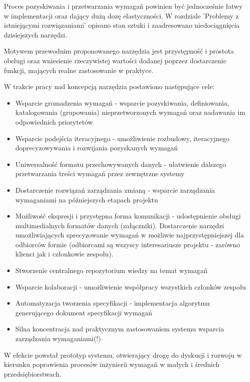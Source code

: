     Proces pozyskiwania i przetwarzania wymagań powinien być jednocześnie łatwy w implementacji oraz dający dużą dozę elastyczności. W rozdziale 'Problemy z istniejącymi rozwiązaniami' opisano stan sztuki i zaadresowano niedociągnięcia dzisiejszych narzędzi. 

    Motywem przewodnim proponowanego narzędzia jest przystępność i prostota obsługi oraz wniesienie rzeczywistej wartości dodanej poprzez dostarczenie funkcji, mających realne zastosowanie w praktyce. 

    W trakcie pracy nad koncepcją narzędzia postawiono następujące cele:
    
    \begin{itemize}
      \item Wsparcie gromadzenia wymagań - wsparcie pozyskiwania, definiowania, katalogowania (grupowania) nieprzetworzonych wymagań oraz nadawania im odpowiednich priorytetów
      \item Wsparcie podejścia iteracyjnego - umożliwienie rozbudowy, iteracyjnego doprecyzowywania i rozwijania pozyskanych wymagań
      \item Uniwersalność formatu przechowywanych danych - ułatwienie dalszego przetwarzania treści wymagań przez zewnętrzne systemy
      \item Dostarczenie rozwiązań zarządzania zmianą - wsparcie zarządzania wymaganiami na późniejszych etapach projektu
      \item Możliwość ekspresji i przystępna forma komunikacji - udostępnienie obsługi multimedialnych formatów danych (załączniki). Dostarczenie narzędzi umożliwiających sprecyzowanie wymagań w możliwie najprzystępniejszej dla odbiorców formie (odbiorcami są wszyscy interesariusze projektu - zarówno klienci jak i członkowie zespołu).
      \item Stworzenie centralnego repozytorium wiedzy na temat wymagań
      \item Wsparcie kolaboracji - umożliwienie współpracy wszystkich członków zespołu
      \item Automatyzacja tworzenia specyfikacji - implementacja algorytmu generującego dokument specyfikacji wymagań 
      \item Silna koncentracja nad praktycznym zastosowaniem systemu wsparcia zarządzania wymaganiami(!) 
    \end{itemize}

    W efekcie powstał prototyp systemu, otwierający drogę do dyskusji i rozwoju w kierunku poprawienia procesów inżynierii wymagań w małych i średnich przedsiębiorstwach. 

